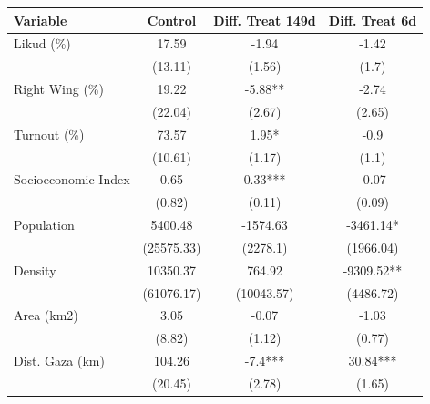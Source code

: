 \begin{table}[!h]
\centering
\begin{tabular}{lccc}
\toprule
Variable & Control & Diff. Treat 149d & Diff. Treat 6d\\
\midrule
Likud (\%) & 17.59 & -1.94 & -1.42\\
 & (13.11) & (1.56) & (1.7)\\
Right Wing (\%) & 19.22 & -5.88** & -2.74\\
 & (22.04) & (2.67) & (2.65)\\
Turnout (\%) & 73.57 & 1.95* & -0.9\\
\addlinespace
 & (10.61) & (1.17) & (1.1)\\
Socioeconomic Index & 0.65 & 0.33*** & -0.07\\
 & (0.82) & (0.11) & (0.09)\\
Population & 5400.48 & -1574.63 & -3461.14*\\
 & (25575.33) & (2278.1) & (1966.04)\\
\addlinespace
Density & 10350.37 & 764.92 & -9309.52**\\
 & (61076.17) & (10043.57) & (4486.72)\\
Area (km2) & 3.05 & -0.07 & -1.03\\
 & (8.82) & (1.12) & (0.77)\\
Dist. Gaza (km) & 104.26 & -7.4*** & 30.84***\\
\addlinespace
 & (20.45) & (2.78) & (1.65)\\
\bottomrule
\end{tabular}
\end{table}
